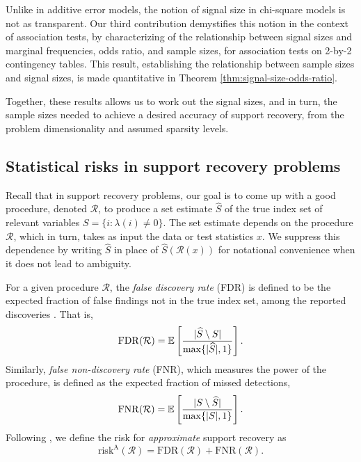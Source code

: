 Unlike in additive error models, the notion of signal size in chi-square models is not as transparent.
Our third contribution demystifies this notion in the context of association tests, by characterizing of the relationship between signal sizes and marginal frequencies, odds ratio, and sample sizes, for association tests on 2-by-2 contingency tables.
This result, establishing the relationship between sample sizes and signal sizes, is made quantitative in Theorem \ref{thm:signal-size-odds-ratio}.

Together, these results allows us to work out the signal sizes, and in turn, the sample sizes needed to achieve a desired accuracy of support recovery, from the problem dimensionality and assumed sparsity levels.

\subsection{Statistical risks in support recovery problems}
\label{subsec:risks}

Recall that in support recovery problems, our goal is to come up with a good procedure, denoted $\mathcal R$, to produce a set estimate $\widehat{S}$ of the true index set of relevant variables  $S=\{i:\lambda(i)\neq 0\}$.
The set estimate depends on the procedure $\mathcal{R}$, which in turn, takes as input the data or test statistics $x$.
We suppress this dependence by writing $\widehat{S}$ in place of $\widehat{S}(\mathcal{R}(x))$ for notational convenience when it does not lead to ambiguity.

For a given procedure $\mathcal{R}$, the \emph{false discovery rate} (FDR) is defined to be the expected fraction of false findings not in the true index set, among the reported discoveries \cite{benjamini1995controlling}. That is,
\begin{equation} \label{eq:FDR}
    \mathrm{FDR}(\mathcal{R}) = \E\left[\frac{|\widehat{S}\setminus S|}{\max\{|\widehat{S}|,1\}}\right].
\end{equation}
Similarly, \emph{false non-discovery rate} (FNR), which measures the power of the procedure, is defined as the expected fraction of missed detections,
\begin{equation} \label{eq:FNR}
    \mathrm{FNR}(\mathcal{R}) = \E\left[\frac{|S\setminus \widehat{S}|}{\max\{|{S}|,1\}}\right].
\end{equation}
Following \cite{arias2017distribution, rabinovich2017optimal}, we define the risk for \emph{approximate} support recovery as
\begin{equation} \label{eq:risk-approximate}
    \mathrm{risk}^{\mathrm{A}}(\mathcal{R}) = \mathrm{FDR}(\mathcal{R}) + \mathrm{FNR}(\mathcal{R}).
\end{equation}

